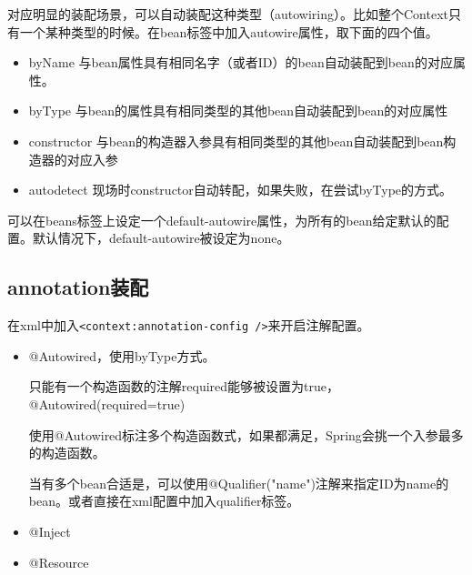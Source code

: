 对应明显的装配场景，可以自动装配这种类型（autowiring）。比如整个Context只有一个某种类型的时候。在bean标签中加入autowire属性，取下面的四个值。

\begin{itemize}
\item byName 与bean属性具有相同名字（或者ID）的bean自动装配到bean的对应属性。
\item byType 与bean的属性具有相同类型的其他bean自动装配到bean的对应属性
\item constructor 与bean的构造器入参具有相同类型的其他bean自动装配到bean构造器的对应入参
\item autodetect 现场时constructor自动转配，如果失败，在尝试byType的方式。
\end{itemize}

可以在beans标签上设定一个default-autowire属性，为所有的bean给定默认的配置。默认情况下，default-autowire被设定为none。


\subsection{annotation装配}

在xml中加入\lstinline$<context:annotation-config />$来开启注解配置。

\begin{itemize}
\item @Autowired，使用byType方式。

只能有一个构造函数的注解required能够被设置为true，@Autowired(required=true)

使用@Autowired标注多个构造函数式，如果都满足，Spring会挑一个入参最多的构造函数。

当有多个bean合适是，可以使用@Qualifier("name")注解来指定ID为name的bean。或者直接在xml配置中加入qualifier标签。



\item @Inject
\item @Resource
\end{itemize}



